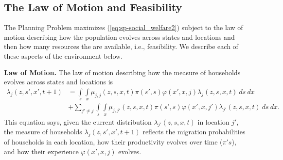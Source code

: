 \documentclass[12pt,pdftex]{article}
\begin{document}
\begin{onehalfspacing}
\subsection{The Law of Motion and Feasibility}

The Planning Problem maximizes (\ref{eq:sp-social_welfare2}) subject to the law of motion describing how the population evolves across states and locations and then how many resources the are available, i.e., feasibility. We describe each of these aspects of the environment below.

\textbf{Law of Motion.} The law of motion describing how the measure of households evolves across states and locations is
\begin{align}
\lambda_{j}(z, s', x', t+1)  & =  \int\limits_{s} \int\limits_{x}  \mu_{j,j}(z, s,x,t)\pi(s',s) \varphi(x',x, j) \lambda_{j}(z, s, x, t)  \ ds \ dx  \  \label{eq:planner_law_motion} \\
& +  \sum_{j' \neq j} \int\limits_{s} \int\limits_{x} \mu_{j,j'}(z, s,x,t) \pi(s',s) \varphi(x',x, j') \lambda_{j'}(z, s, x, t)  \ ds  \ dx. \nonumber
\end{align}
This equation says, given the current distribution $\lambda_{j'}(z, s, x, t)$ in location $j'$, the measure of households $\lambda_{j}(z, s', x', t+1)$ reflects the migration probabilities of households in each location, how their productivity evolves over time ($\pi's$), and how their experience $\varphi(x',x, j)$ evolves.


\end{onehalfspacing}
\end{document}

